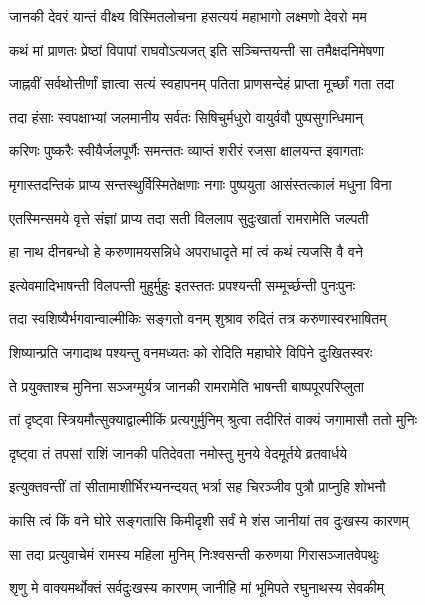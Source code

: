 \twolineshloka
{जानकी देवरं यान्तं वीक्ष्य विस्मितलोचना}
{हसत्ययं महाभागो लक्ष्मणो देवरो मम}%

\twolineshloka
{कथं मां प्राणतः प्रेष्ठां विपापां राघवोऽत्यजत्}
{इति सञ्चिन्तयन्ती सा तमैक्षदनिमेषणा}%

\twolineshloka
{जाह्नवीं सर्वथोत्तीर्णां ज्ञात्वा सत्यं स्वहापनम्}
{पतिता प्राणसन्देहं प्राप्ता मूर्च्छां गता तदा}%

\twolineshloka
{तदा हंसाः स्वपक्षाभ्यां जलमानीय सर्वतः}
{सिषिचुर्मधुरो वायुर्ववौ पुष्पसुगन्धिमान्}%

\twolineshloka
{करिणः पुष्करैः स्वीयैर्जलपूर्णैः समन्ततः}
{व्याप्तं शरीरं रजसा क्षालयन्त इवागताः}%

\twolineshloka
{मृगास्तदन्तिकं प्राप्य सन्तस्थुर्विस्मितेक्षणाः}
{नगाः पुष्पयुता आसंस्तत्कालं मधुना विना}%

\twolineshloka
{एतस्मिन्समये वृत्ते संज्ञां प्राप्य तदा सती}
{विललाप सुदुःखार्ता रामरामेति जल्पती}%

\twolineshloka
{हा नाथ दीनबन्धो हे करुणामयसन्निधे}
{अपराधादृते मां त्वं कथं त्यजसि वै वने}%

\twolineshloka
{इत्येवमादिभाषन्ती विलपन्ती मुहुर्मुहुः}
{इतस्ततः प्रपश्यन्ती सम्मूर्च्छन्ती पुनःपुनः}%

\twolineshloka
{तदा स्वशिष्यैर्भगवान्वाल्मीकिः सङ्गतो वनम्}
{शुश्राव रुदितं तत्र करुणास्वरभाषितम्}%

\twolineshloka
{शिष्यान्प्रति जगादाथ पश्यन्तु वनमध्यतः}
{को रोदिति महाघोरे विपिने दुःखितस्वरः}%

\twolineshloka
{ते प्रयुक्ताश्च मुनिना सञ्जग्मुर्यत्र जानकी}
{रामरामेति भाषन्ती बाष्पपूरपरिप्लुता}%

\twolineshloka
{तां दृष्ट्वा स्त्रियमौत्सुक्याद्वाल्मीकिं प्रत्यगुर्मुनिम्}
{श्रुत्वा तदीरितं वाक्यं जगामासौ ततो मुनिः}%

\twolineshloka
{दृष्ट्वा तं तपसां राशिं जानकी पतिदेवता}
{नमोस्तु मुनये वेदमूर्तये व्रतवार्धये}%

\twolineshloka
{इत्युक्तवन्तीं तां सीतामाशीर्भिरभ्यनन्दयत्}
{भर्त्रा सह चिरञ्जीव पुत्रौ प्राप्नुहि शोभनौ}%

\twolineshloka
{कासि त्वं किं वने घोरे सङ्गतासि किमीदृशी}
{सर्वं मे शंस जानीयां तव दुःखस्य कारणम्}%

\twolineshloka
{सा तदा प्रत्युवाचेमं रामस्य महिला मुनिम्}
{निःश्वसन्ती करुणया गिरासञ्जातवेपथुः}%

\twolineshloka
{शृणु मे वाक्यमर्थोक्तं सर्वदुःखस्य कारणम्}
{जानीहि मां भूमिपते रघुनाथस्य सेवकीम्}%

